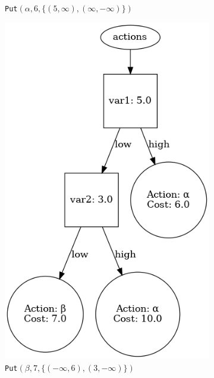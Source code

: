 \documentclass{article}
\begin{document}
\begin{figure}[H]
\begin{subfigure}[t]{0.3\textwidth}
        \captionsetup{labelformat=empty}
        \caption{%
            \texttt{Put}$(\alpha, 6, \{(5, \infty),(\infty,-\infty)\})$
        }
    \end{subfigure}
    \begin{subfigure}[t]{0.3\textwidth}
        \centering
        \includegraphics[width=.8\textwidth]{exampleBuild2}
        \captionsetup{labelformat=empty}
        \caption{%
            \texttt{Put}$(\beta, 7, \{(-\infty, 6),(3,-\infty)\})$
        }
    \end{subfigure}
    \begin{subfigure}[t]{0.35\textwidth}
        \centering

\end{subfigure}
\end{figure}
\end{document}
